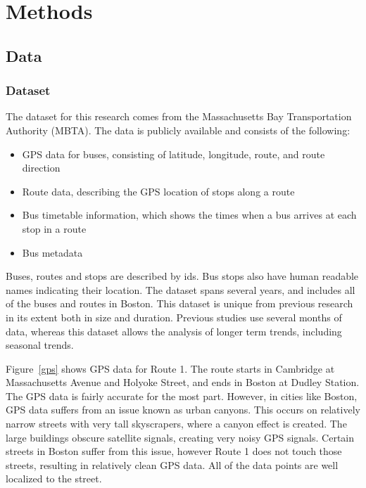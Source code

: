 \chapter{Methods}
\section{Data}\label{data}

\subsection{Dataset}

The dataset for this research comes from the Massachusetts Bay Transportation Authority (MBTA).  The data is publicly available and consists of the following:

\begin{itemize}
  \item GPS data for buses, consisting of latitude, longitude, route, and route direction
  \item Route data, describing the GPS location of stops along a route
  \item Bus timetable information, which shows the times when a bus arrives at each stop in a route
  \item Bus metadata
\end{itemize}

Buses, routes and stops are described by ids.  Bus stops also have human readable names indicating their location.
The dataset spans several years, and includes all of the buses and routes in Boston.
This dataset is unique from previous research in its extent both in size and duration.
Previous studies use several months of data, whereas this dataset allows the analysis of longer term trends, including seasonal trends.

Figure~\ref{gps} shows GPS data for Route 1.  The route starts in Cambridge at Massachusetts Avenue and Holyoke Street, and ends in Boston at Dudley Station.
The GPS data is fairly accurate for the most part.
However, in cities like Boston, GPS data suffers from an issue known as urban canyons.
This occurs on relatively narrow streets with very tall skyscrapers, where a canyon effect is created.
The large buildings obscure satellite signals, creating very noisy GPS signals.
Certain streets in Boston suffer from this issue, however Route 1 does not touch those streets, resulting in relatively clean GPS data.
All of the data points are well localized to the street.

